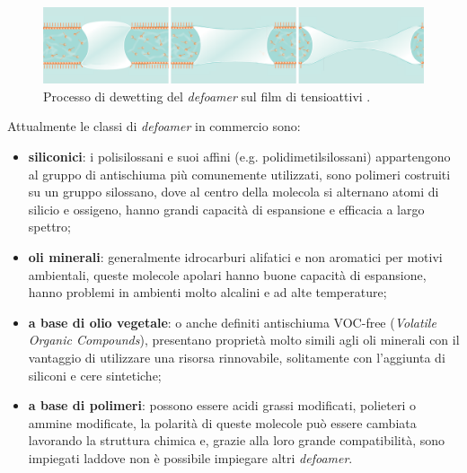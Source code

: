 \begin{figure}[htbp]
    \centering
    \includegraphics[height=.11\textheight]{fig/foamer/dewetting.png}
    \caption{Processo di dewetting del \textit{defoamer} sul film di tensioattivi \parencite{tego2014brochure}.}
    \label{fig:dewetting}
\end{figure}

Attualmente le classi di \textit{defoamer} in commercio sono:
\begin{itemize}
    \item \textbf{siliconici}: i polisilossani e suoi affini (e.g. polidimetilsilossani) appartengono al gruppo di antischiuma più comunemente utilizzati, sono polimeri costruiti su un gruppo silossano, dove al centro della molecola si alternano atomi di silicio e ossigeno, hanno grandi capacità di espansione e efficacia a largo spettro;
    \item \textbf{oli minerali}: generalmente idrocarburi alifatici e non aromatici per motivi ambientali, queste molecole apolari hanno buone capacità di espansione, hanno problemi in ambienti molto alcalini e ad alte temperature;
    \item \textbf{a base di olio vegetale}: o anche definiti antischiuma VOC-free (\textit{Volatile Organic Compounds}), presentano proprietà molto simili agli oli minerali con il vantaggio di utilizzare una risorsa rinnovabile, solitamente con l'aggiunta di siliconi e cere sintetiche;
    \item \textbf{a base di polimeri}: possono essere acidi grassi modificati, polieteri o ammine modificate, la polarità di queste molecole può essere cambiata lavorando la struttura chimica e, grazie alla loro grande compatibilità, sono impiegati laddove non è possibile impiegare altri \textit{defoamer}.
\end{itemize}

